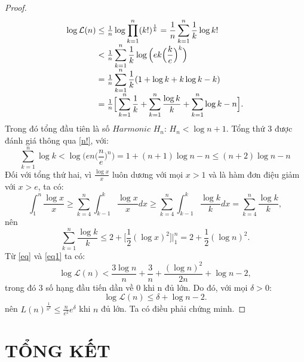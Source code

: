 \documentclass[a4paper, 12pt]{report}
\begin{document}
\begin{proof}
\begin{equation*}
\begin{array}{l@{}l}
			\log\mathcal{L}(n)
			&{} \leq \frac{1}{n}\log \displaystyle \prod_{k=1}^{n}(k!)^{\frac{1}{k}} = \frac{1}{n} \displaystyle \sum_{k=1}^{n}\frac{1}{k}\log k! \\ 
			&{} < \frac{1}{n}\displaystyle \sum_{k=1}^{n}\frac{1}{k}\log\Big( ek \Big(\frac{k}{e}\Big)^{k} \Big) \\
			&{} = \frac{1}{n} \displaystyle \sum_{k=1}^{n}\frac{1}{k}(1 +\log k + k\log k -k) \\
			&{} = \frac{1}{n} \Big[\displaystyle \sum_{k=1}^{n}\frac{1}{k} + \displaystyle \sum_{k=1}^{n}\frac{\log k}{k} + \displaystyle \sum_{k=1}^{n}\log k -n \Big].
		\end{array}
		\end{equation*}
		Trong đó tổng đầu tiên là số $Harmonic$ $H_n$: $H_n < \log n +1$. Tổng thứ 3 được đánh giá thông qua \eqref{n!}, với:
		\begin{equation}
			\displaystyle \sum_{k=1}^{n} \log k < \log\Big( en\Big(\frac{n}{e}\Big)^{n}\Big) = 1+ (n+1)\log n -n \leq (n+2 )\log n - n \label{eq}
		\end{equation}
		Đối với tổng thứ hai, vì $\frac{\log x}{x}$ luôn dương với mọi $x>1$ và là hàm đơn điệu giảm với $x >e$, ta có:
		\begin{equation*}
			\int_{1}^{n}\frac{\log x}{x} \geq \displaystyle \sum_{k=4}^{n}\int_{k-1}^{k}\frac{\log x}{x}dx \geq \displaystyle \sum_{k=4}^{n}\int_{k-1}^{k}\frac{\log k}{k}dx = \displaystyle \sum_{k=4}^{n}\frac{\log k}{k},
		\end{equation*}
		nên 
		\begin{equation}
			 \displaystyle \sum_{k=1}^{n}\frac{\log k}{k} \leq 2 + \Big[\frac{1}{2}(\log x)^2\Big] \Big|_1^n  = 2+ \frac{1}{2}(\log n)^2. \label{eq1}
		\end{equation}
Từ \eqref{eq} và \eqref{eq1} ta có: 
\begin{equation*}
	\log \mathcal{L}(n) < \frac{3\log n}{n} + \frac{3}{n} + \frac{(\log n)^2}{2n} + \log n -2,
\end{equation*}
trong đó 3 số hạng đầu tiến dần về 0 khi n đủ lớn. Do đó, với mọi $\delta >0$:
\begin{equation*}
	\log \mathcal{L}(n) \leq \delta +\log n -2 .
\end{equation*}
nên $L(n)^\frac{1}{n^2} \leq \frac{n}{e^2}e^{\delta}$ khi $n$ đủ lớn. Ta có điều phải chứng minh.
\end{proof}


\chapter*{TỔNG KẾT}
\mdseries
\end{document}
